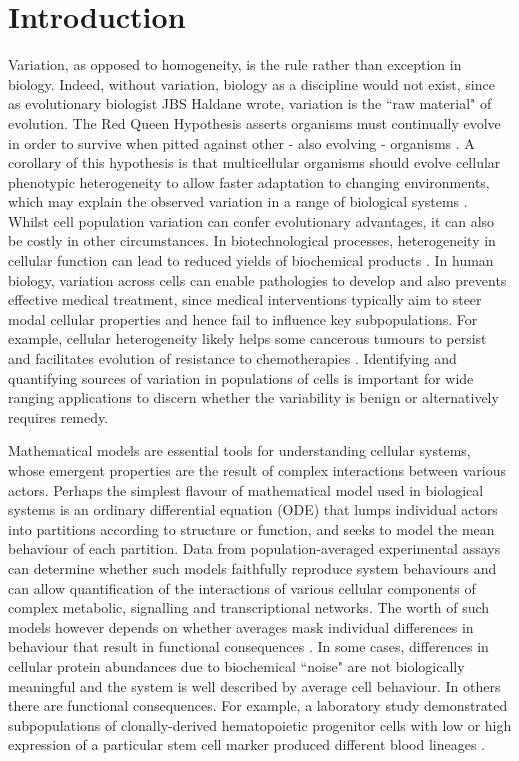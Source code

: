 \section{Introduction}
Variation, as opposed to homogeneity, is the rule rather than exception in biology. Indeed, without variation, biology as a discipline would not exist, since as evolutionary biologist JBS Haldane wrote, variation is the ``raw material" of evolution. The Red Queen Hypothesis asserts organisms must continually evolve in order to survive when pitted against other - also evolving - organisms \cite{ridley1994red}. A corollary of this hypothesis is that multicellular organisms should evolve cellular phenotypic heterogeneity to allow faster adaptation to changing environments, which may explain the observed variation in a range of biological systems \cite{fraser2009chance}. Whilst cell population variation can confer evolutionary advantages, it can also be costly in other circumstances. In biotechnological processes, heterogeneity in cellular function can lead to reduced yields of biochemical products \cite{delvigne2014metabolic}. In human biology, variation across cells can enable pathologies to develop and also prevents effective medical treatment, since medical interventions typically aim to steer modal cellular properties and hence fail to influence key subpopulations. For example, cellular heterogeneity likely helps some cancerous tumours to persist \cite{gatenby2007cellular} and facilitates evolution of resistance to chemotherapies \cite{altrock2015mathematics}. Identifying and quantifying sources of variation in populations of cells is important for wide ranging applications to discern whether the variability is benign or alternatively requires remedy.

Mathematical models are essential tools for understanding cellular systems, whose emergent properties are the result of complex interactions between various actors. Perhaps the simplest flavour of mathematical model used in biological systems is an ordinary differential equation (ODE) that lumps individual actors into partitions according to structure or function, and seeks to model the mean behaviour of each partition. Data from population-averaged experimental assays can determine whether such models faithfully reproduce system behaviours and can allow quantification of the interactions of various cellular components of complex metabolic, signalling and transcriptional networks. The worth of such models however depends on whether averages mask individual differences in behaviour that result in functional consequences \cite{altschuler2010cellular}. In some cases, differences in cellular protein abundances due to biochemical ``noise" are not biologically meaningful  \cite{elowitz2002stochastic} and the system is well described by average cell behaviour. In others there are functional consequences. For example, a laboratory study demonstrated subpopulations of clonally-derived hematopoietic progenitor cells with low or high expression of a particular stem cell marker produced different blood lineages \cite{chang2008transcriptome}.

